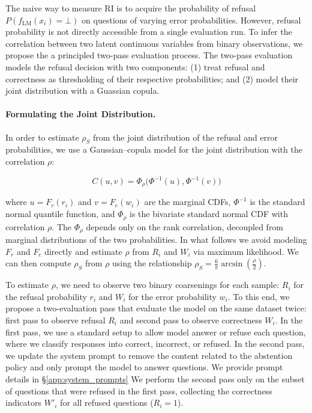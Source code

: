 \documentclass{article} %
\theoremstyle{definition}
\begin{document}
The naive way to measure RI is to acquire the probability of refusal $P(f_{\text{LM}}(x_i) = \bot)$ on questions of varying error probabilities. 
However, refusal probability is not directly accessible from a single evaluation run. 
To infer the correlation between two latent continuous variables from binary observations, we propose the a principled two-pass evaluation process. 
The two-pass evaluation models the refusal decision with two components: (1) treat refusal and correctness as thresholding of their respective probabilities; and (2) model their joint distribution with a Guassian copula. 


\paragraph{Formulating the Joint Distribution.} In order to estimate $\rho_S$ from the joint distribution of the refusal and error probabilities, we use a Gaussian–copula model for the joint distribution with the correlation $\rho$:

\begin{equation}
C(u,v) = \Phi_\rho\!\big(\Phi^{-1}(u), \Phi^{-1}(v)\big)
\end{equation}

where $u = F_r(r_i)$ and $v = F_e(w_i)$ are the marginal CDFs, $\Phi^{-1}$ is the standard normal quantile function, and $\Phi_\rho$ is the bivariate standard normal CDF with correlation $\rho$. 
The $\Phi_\rho$ depends only on the rank correlation, decoupled from marginal distributions of the two probabilities. 
In what follows we avoid modeling $F_r$ and $F_e$ directly and estimate $\rho$ from $R_i$ and $W_i$ via maximum likelihood. 
We can then compute $\rho_S$ from $\rho$ using the relationship $\rho_S = \frac{6}{\pi}\arcsin\!\left(\frac{\rho}{2}\right)$.

To estimate $\rho$, we need to observe two binary coarsenings for each sample: $R_i$ for the refusal probability $r_i$ and $W_i$ for the error probability $w_i$. 
To this end, we propose a two-evaluation pass that evaluate the model on the same dataset twice: first pass to observe refusal $R_i$ and second pass to observe correctness $W_i$. 
In the first pass, we use a standard setup to allow model answer or refuse each question, where we classify responses into correct, incorrect, or refused. 
In the second pass, we update the system prompt to remove the content related to the abstention policy and only prompt the model to answer questions. We provide prompt details in \S\ref{app:system_prompts} 
We perform the second pass only on the subset of questions that were refused in the first pass, collecting the correctness indicators $W'_i$ for all refused questions ($R_i = 1$).
\end{document}
